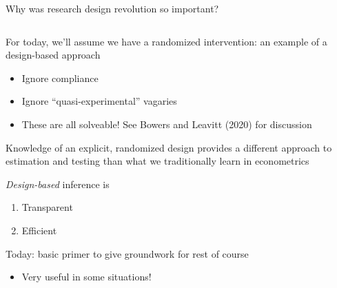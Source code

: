 \documentclass[notes,11pt, aspectratio=169]{beamer}
\newenvironment{wideitemize}{\itemize\addtolength{\itemsep}{10pt}}{\enditemize}
\begin{document}
\begin{frame}{Why was research design revolution so important?}
\begin{columns}[T] %
  \begin{column}{.7\textwidth}
    \begin{wideitemize}
    \item For today, we'll assume we have a randomized intervention: an example of a design-based approach
      \begin{itemize}
      \item Ignore compliance
      \item Ignore ``quasi-experimental'' vagaries
      \item These are all solveable! See Bowers and Leavitt (2020) for discussion
      \end{itemize}
    \item Knowledge of an explicit, randomized design provides a different
      approach to estimation and testing than what we traditionally learn in econometrics
    \item \emph{Design-based} inference is
      \begin{enumerate}
      \item Transparent
      \item Efficient
      \end{enumerate}
    \item Today: basic primer to give groundwork for rest of course
      \begin{itemize}
      \item Very useful in some situations!
      \end{itemize}
    \end{wideitemize}
\end{column}%
\hfill%
\begin{column}{.6\textwidth}
\end{column}%
\end{columns}
\end{frame}
\end{document}
